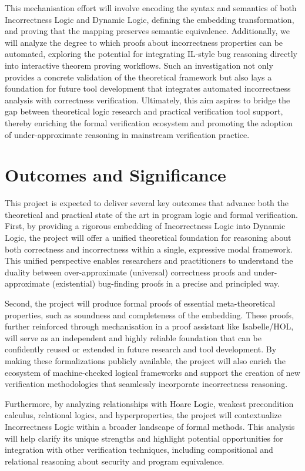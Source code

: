This mechanisation effort will involve encoding the syntax and semantics of both Incorrectness Logic and Dynamic Logic, defining the embedding transformation, and proving that the mapping preserves semantic equivalence. Additionally, we will analyze the degree to which proofs about incorrectness properties can be automated, exploring the potential for integrating IL-style bug reasoning directly into interactive theorem proving workflows. Such an investigation not only provides a concrete validation of the theoretical framework but also lays a foundation for future tool development that integrates automated incorrectness analysis with correctness verification. Ultimately, this aim aspires to bridge the gap between theoretical logic research and practical verification tool support, thereby enriching the formal verification ecosystem and promoting the adoption of under-approximate reasoning in mainstream verification practice.

\section*{Outcomes and Significance}
This project is expected to deliver several key outcomes that advance both the theoretical and practical state of the art in program logic and formal verification. First, by providing a rigorous embedding of Incorrectness Logic into Dynamic Logic, the project will offer a unified theoretical foundation for reasoning about both correctness and incorrectness within a single, expressive modal framework. This unified perspective enables researchers and practitioners to understand the duality between over-approximate (universal) correctness proofs and under-approximate (existential) bug-finding proofs in a precise and principled way.

Second, the project will produce formal proofs of essential meta-theoretical properties, such as soundness and completeness of the embedding. These proofs, further reinforced through mechanisation in a proof assistant like Isabelle/HOL, will serve as an independent and highly reliable foundation that can be confidently reused or extended in future research and tool development. By making these formalizations publicly available, the project will also enrich the ecosystem of machine-checked logical frameworks and support the creation of new verification methodologies that seamlessly incorporate incorrectness reasoning.

Furthermore, by analyzing relationships with Hoare Logic, weakest precondition calculus, relational logics, and hyperproperties, the project will contextualize Incorrectness Logic within a broader landscape of formal methods. This analysis will help clarify its unique strengths and highlight potential opportunities for integration with other verification techniques, including compositional and relational reasoning about security and program equivalence.

